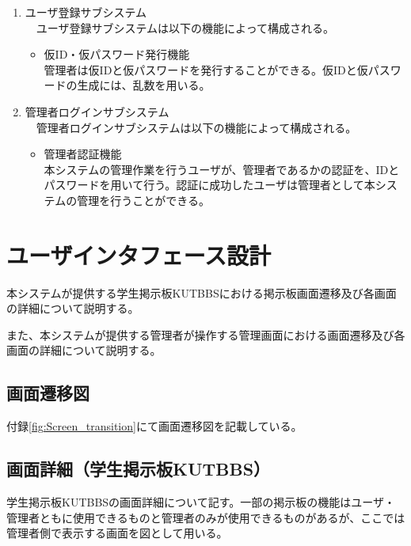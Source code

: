 \documentclass[a4j]{jarticle}
\begin{document}
\begin{enumerate}
  \item ユーザ登録サブシステム\\
  　ユーザ登録サブシステムは以下の機能によって構成される。
  \begin{itemize}
    \item 仮ID・仮パスワード発行機能\\
    管理者は仮IDと仮パスワードを発行することができる。仮IDと仮パスワードの生成には、乱数を用いる。\\
  \end{itemize}


  \item 管理者ログインサブシステム\\
  　管理者ログインサブシステムは以下の機能によって構成される。
  \begin{itemize}
    \item 管理者認証機能\\
    本システムの管理作業を行うユーザが、管理者であるかの認証を、IDとパスワードを用いて行う。認証に成功したユーザは管理者として本システムの管理を行うことができる。
  \end{itemize}

\end{enumerate}



\section{ユーザインタフェース設計}

本システムが提供する学生掲示板KUTBBSにおける掲示板画面遷移及び各画面の詳細について説明する。

また、本システムが提供する管理者が操作する管理画面における画面遷移及び各画面の詳細について説明する。

\subsection{画面遷移図}
付録\ref{fig:Screen_transition}にて画面遷移図を記載している。

\subsection{画面詳細（学生掲示板KUTBBS）}
学生掲示板KUTBBSの画面詳細について記す。一部の掲示板の機能はユーザ・管理者ともに使用できるものと管理者のみが使用できるものがあるが、ここでは管理者側で表示する画面を図として用いる。
\end{document}
